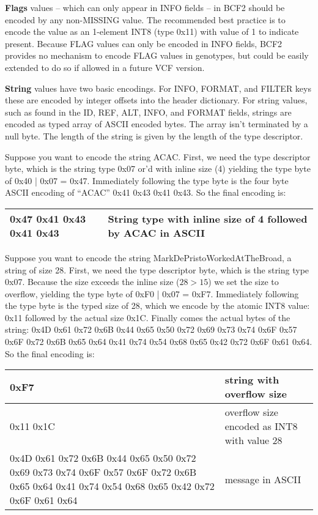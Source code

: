 \documentclass[8pt]{article}
\begin{document}
\vspace{0.3cm}
\textbf{Flags} values -- which can only appear in INFO fields -- in BCF2 should be encoded by any non-MISSING value.  The recommended best practice is to encode the value as an 1-element INT8 (type 0x11) with value of 1 to indicate present.  Because FLAG values can only be encoded in INFO fields, BCF2 provides no mechanism to encode FLAG values in genotypes, but could be easily extended to do so if allowed in a future VCF version.

\vspace{0.3cm}
\textbf{String} values have two basic encodings.  For INFO, FORMAT, and FILTER keys these are encoded by integer offsets into the header dictionary.  For string values, such as found in the ID, REF, ALT, INFO, and FORMAT fields, strings are encoded as typed array of ASCII encoded bytes.  The array isn't terminated by a null byte.  The length of the string is given by the length of the type descriptor.

Suppose you want to encode the string ACAC.  First, we need the type descriptor byte, which is the string type 0x07 or'd with inline size (4) yielding the type byte of 0x40 | 0x07 = 0x47.  Immediately following the type byte is the four byte ASCII encoding of ``ACAC'' 0x41 0x43 0x41 0x43.  So the final encoding is:

\vspace{0.1cm}
\begin{tabular}{| l | l |} \hline
0x47 0x41 0x43 0x41 0x43 & String type with inline size of 4 followed by ACAC in ASCII \\ \hline
\end{tabular}
\vspace{0.3cm}

Suppose you want to encode the string MarkDePristoWorkedAtTheBroad, a string of size 28.  First, we need the type descriptor byte, which is the string type 0x07.  Because the size exceeds the inline size ($28 > 15$) we set the size to overflow, yielding the type byte of 0xF0 | 0x07 = 0xF7.  Immediately following the type byte is the typed size of 28, which we encode by the atomic INT8 value: 0x11 followed by the actual size 0x1C.  Finally comes the actual bytes of the string: 
0x4D 0x61 0x72 0x6B 0x44 0x65 0x50 0x72 0x69 0x73 0x74 0x6F 0x57 0x6F 0x72 0x6B 0x65 0x64 0x41 0x74 0x54 0x68 0x65 0x42 0x72 0x6F 0x61 0x64.  So the final encoding is:

\vspace{0.3cm}
\begin{tabular}{ | p{9cm} | p{6cm} | } \hline
0xF7 & string with overflow size \\ \hline
0x11 0x1C & overflow size encoded as INT8 with value 28 \\ \hline
0x4D 0x61 0x72 0x6B 0x44 0x65 0x50 0x72 0x69 0x73 0x74 0x6F 0x57 0x6F 0x72 0x6B 0x65 0x64 0x41 0x74 0x54 0x68 0x65 0x42 0x72 0x6F 0x61 0x64 & message in ASCII \\ \hline
\end{tabular}
\vspace{0.3cm}
\end{document}
